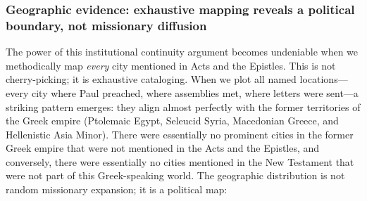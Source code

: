 \subsubsection{Geographic evidence: exhaustive mapping reveals a political boundary, not missionary diffusion}

The power of this institutional continuity argument becomes undeniable when we methodically map \emph{every} city mentioned in Acts and the Epistles.
This is not cherry-picking; it is exhaustive cataloging.
When we plot all named locations---every city where Paul preached, where assemblies met, where letters were sent---a striking pattern emerges: they align almost perfectly with the former territories of the Greek empire (Ptolemaic Egypt, Seleucid Syria, Macedonian Greece, and Hellenistic Asia Minor).
There were essentially no prominent cities in the former Greek empire that were not mentioned in the Acts and the Epistles, and conversely, there were essentially no cities mentioned in the New Testament that were not part of this Greek-speaking world.
The geographic distribution is not random missionary expansion; it is a political map:

